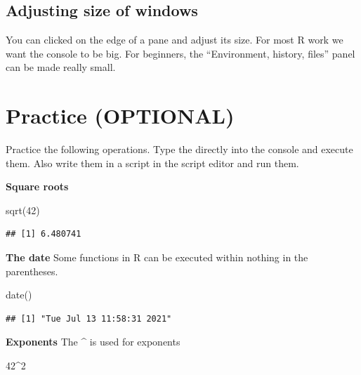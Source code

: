 \documentclass[
]{book}
\newenvironment{Shaded}{\begin{snugshade}}{\end{snugshade}}
\newcommand{\DecValTok}[1]{\textcolor[rgb]{0.00,0.00,0.81}{#1}}
\newcommand{\FunctionTok}[1]{\textcolor[rgb]{0.00,0.00,0.00}{#1}}
\newcommand{\NormalTok}[1]{#1}
\newcommand{\SpecialCharTok}[1]{\textcolor[rgb]{0.00,0.00,0.00}{#1}}
\begin{document}
\hypertarget{adjusting-size-of-windows}{%
\subsection{Adjusting size of windows}\label{adjusting-size-of-windows}}

You can clicked on the edge of a pane and adjust its size. For most R work we want the console to be big. For beginners, the ``Environment, history, files'' panel can be made really small.

\hypertarget{practice-optional}{%
\section{Practice (OPTIONAL)}\label{practice-optional}}

Practice the following operations. Type the directly into the console and execute them. Also write them in a script in the script editor and run them.

\textbf{Square roots}

\begin{Shaded}
\begin{Highlighting}[]
\FunctionTok{sqrt}\NormalTok{(}\DecValTok{42}\NormalTok{)}
\end{Highlighting}
\end{Shaded}

\begin{verbatim}
## [1] 6.480741
\end{verbatim}

\textbf{The date}
Some functions in R can be executed within nothing in the parentheses.

\begin{Shaded}
\begin{Highlighting}[]
\FunctionTok{date}\NormalTok{()}
\end{Highlighting}
\end{Shaded}

\begin{verbatim}
## [1] "Tue Jul 13 11:58:31 2021"
\end{verbatim}

\textbf{Exponents}
The \textbf{\^{}} is used for exponents

\begin{Shaded}
\begin{Highlighting}[]
\DecValTok{42}\SpecialCharTok{\^{}}\DecValTok{2}
\end{Highlighting}
\end{Shaded}
\end{document}

